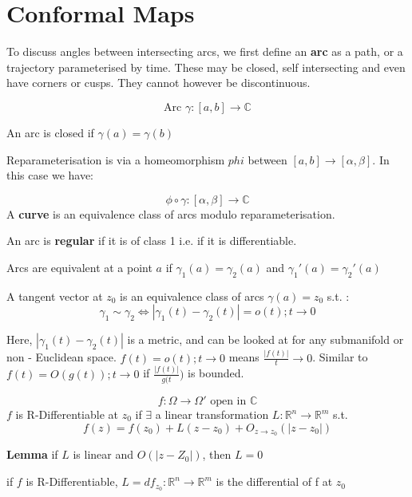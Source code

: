 \documentclass{article}
\begin{document}
\section{Conformal Maps}
\begin{flushleft}
To discuss angles between intersecting arcs, we first define an \textbf{arc} as a path, or a trajectory parameterised by time. These may be closed, self intersecting and even have corners or cusps. They cannot however be discontinuous.

\begin{equation}
\textrm{Arc } \gamma:[a,b] \to \mathbb{C}
\end{equation}

An arc is closed if $\gamma (a) = \gamma (b) $
\par
Reparameterisation is via a homeomorphism $phi$ between $[a,b] \to [\alpha, \beta]$. In this case we have:

\begin{equation}
    \phi \circ \gamma : [\alpha,\beta] \to \mathbb{C}
\end{equation}
A \textbf{curve} is an equivalence class of arcs modulo reparameterisation. \par An arc is \textbf{regular} if it is of class 1 i.e. if it is differentiable. \par Arcs are equivalent at a point $a$ if $\gamma_{1} (a) = \gamma_{2}(a)$ and $\gamma_1 ' (a) = \gamma_2 '(a)$

A tangent vector at $z_0$ is an equivalence class of arcs $\gamma(a) = z_0$ s.t. :
\begin{equation}
\gamma_1 \sim \gamma_2 \iff |\gamma_1 (t) - \gamma_2 (t)| = o(t) ; t\to 0 
\end{equation}

Here, $|\gamma_1 (t) - \gamma_2 (t)|$ is a metric, and can be looked at for any submanifold or non - Euclidean space. $f(t) = o(t);t\to 0$ means $\frac{|f(t)|}{t} \to 0$. Similar to $f(t) = O(g(t));t\to 0 $ if $ \frac{|f(t)|}{g(t})$ is bounded.
\par\begin{equation}
    f: \Omega \to \Omega' \textrm{ open in $\mathbb{C}$}
\end{equation}
$f$ is R-Differentiable at $z_0$ if $\exists$ a linear transformation $L :\mathbb{R}^n \to \mathbb{R}^m$ s.t.
\begin{equation}
    f(z) = f(z_0) + L(z-z_0) + O_{z\to z_0}(|z-z_0|)
\end{equation}
\par \textbf{Lemma} if $L$ is linear and $O(|z-Z_0|)$, then $L = 0$
\par if $f$ is R-Differentiable, $L = df_{z_0} : \mathbb{R}^n \to \mathbb{R}^m $ is the differential of f at $z_0$


\end{flushleft}
\end{document}
